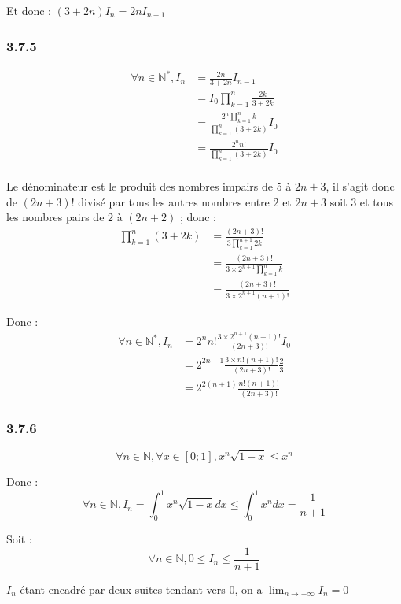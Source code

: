 \documentclass[a4paper,10pt]{report}
\begin{document}
Et donc : $(3+2n)I_n = 2n I_{n-1}$

\subsubsection*{3.7.5}

\begin{equation*}
	\begin{split}
		\forall n \in \mathbb{N}^*, I_n 
			&= \frac{2n}{3+2n}I_{n-1} \\
			&= I_0 \prod_{k=1}^{n}\frac{2k}{3+2k}\\
			&= \frac{2^n \prod_{k=1}^{n} k}{\prod_{k=1}^{n} (3+2k)} I_0 \\
			&= \frac{2^n n!}{\prod_{k=1}^{n} (3+2k)} I_0 \\
	\end{split}
\end{equation*}

Le dénominateur est le produit des nombres impairs de $5$ à $2n+3$, il s'agit donc de $(2n+3)!$ divisé par tous les autres
nombres entre $2$ et $2n+3$ soit $3$ et tous les nombres pairs de $2$ à $(2n+2)$ ; donc :
\begin{equation*}
	\begin{split}
		\prod_{k=1}^{n} (3+2k) &= \frac{(2n+3)!}{3 \prod_{k=1}^{n+1} 2k} \\
		                       &= \frac{(2n+3)!}{3 \times 2^{n+1} \prod_{k=1}^{n}k }\\
			                   &= \frac{(2n+3)!}{3 \times 2^{n+1} (n+1)!}		
	\end{split}
\end{equation*}

Donc :
\begin{equation*}
	\begin{split}
		\forall n \in \mathbb{N}^*, I_n 
			&= 2^n n! \frac{3 \times 2^{n+1} (n+1)!}{(2n+3)!}I_0 \\
			&= 2^{2n+1} \frac{3 \times  n!(n+1)!}{(2n+3)!} \frac{2}{3} \\
			&= 2^{2(n+1)} \frac{n!(n+1)!}{(2n+3)!}
	\end{split}
\end{equation*}

\subsubsection*{3.7.6}
\begin{displaymath}
	\forall n \in \mathbb{N}, \forall x \in [0;1], x^n \sqrt{1-x} \leq x^n
\end{displaymath}

Donc :
\begin{displaymath}
	\forall n \in \mathbb{N},I_n = \int_0^1 x^n \sqrt{1-x} dx \leq \int_0^1 x^n dx = \frac{1}{n+1}
\end{displaymath}

Soit :
\begin{displaymath}
	\forall n \in \mathbb{N}, 0\leq I_n  \leq  \frac{1}{n+1}
\end{displaymath}

$I_n$ étant encadré par deux suites tendant vers $0$, on a $\lim_{n \rightarrow +\infty} I_n = 0$
\end{document}
